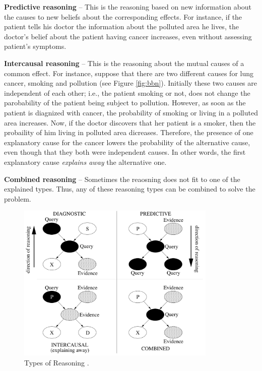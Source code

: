 \documentclass[11pt]{article}
\begin{document}
\textbf{Predictive reasoning} -- This is the reasoning based on new information
about the causes to new beliefs about the corresponding effects. For instance,
if the patient tells his doctor the information about the polluted area he
lives, the doctor's belief about the patient having cancer increases, even
without assessing patient's symptoms.

\textbf{Intercausal reasoning} -- This is the reasoning about the mutual causes
of a common effect. For instance,  suppose that there are two different causes
for lung cancer, smoking and pollution (see Figure \ref{fig:bbn}). Initially
these two causes are independent of each other; i.e., the patient smoking or
not, does not change the parobability of the patient being subject to pollution.
However, as soon as the patient is diagnized with cancer, the probability of
smoking or living in a polluted area increases. Now, if the doctor discovers
that her patient is a smoker, then the probaility of him living in polluted area
dicreases. Therefore, the presence of one explanatory cause for the cancer
lowers the probability of the alternative cause, even though that they both were
independent causes. In other words, the first explanatory cause \textit{explains
away} the alternative one.

\textbf{Combined reasoning} -- Sometimes the reaosning does not fit to one of
the explained types. Thus, any of these reasoning types can be combined to solve
the problem.

\begin{figure}[tbh]
  \center
  \includegraphics[width=0.85\textwidth]{figure/reasoning-types.png}
  \caption{Types of Reasoning \cite{korb:bayesian-ai}.}
  \label{fig:reasoning-types}
\end{figure}
\end{document}
